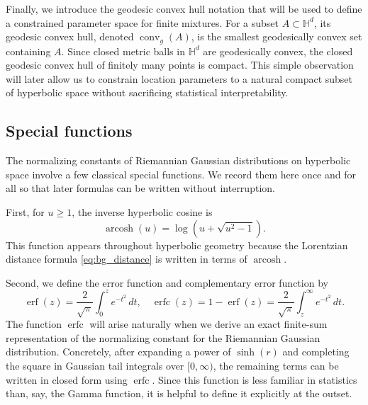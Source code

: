 \documentclass[11pt]{article}
\begin{document}
Finally, we introduce the geodesic convex hull notation that will be used to define a constrained parameter space for finite mixtures. For a subset \(A\subset\mathbb{H}^d\), its geodesic convex hull, denoted \(\operatorname{conv}_g(A)\), is the smallest geodesically convex set containing \(A\). Since closed metric balls in \(\mathbb{H}^d\) are geodesically convex, the closed geodesic convex hull of finitely many points is compact. This simple observation will later allow us to constrain location parameters to a natural compact subset of hyperbolic space without sacrificing statistical interpretability.

\subsection{Special functions}\label{subsec:background_special}

The normalizing constants of Riemannian Gaussian distributions on hyperbolic space involve a few classical special functions. We record them here once and for all so that later formulas can be written without interruption.

First, for \(u\ge 1\), the inverse hyperbolic cosine is
\begin{equation}\label{eq:bg_arcosh}
\operatorname{arcosh}(u)
=
\log\!\left(u+\sqrt{u^2-1}\right).
\end{equation}
This function appears throughout hyperbolic geometry because the Lorentzian distance formula \eqref{eq:bg_distance} is written in terms of \(\operatorname{arcosh}\).

Second, we define the error function and complementary error function by
\begin{equation*}
\operatorname{erf}(z)
=
\frac{2}{\sqrt{\pi}}\int_0^z e^{-t^2}\,dt,\quad \operatorname{erfc}(z)
=
1-\operatorname{erf}(z)
=
\frac{2}{\sqrt{\pi}}\int_z^\infty e^{-t^2}\,dt.
\end{equation*}
The function \(\operatorname{erfc}\) will arise naturally when we derive an exact finite-sum representation of the normalizing constant for the Riemannian Gaussian distribution. Concretely, after expanding a power of \(\sinh(r)\) and completing the square in Gaussian tail integrals over \([0,\infty)\), the remaining terms can be written in closed form using \(\operatorname{erfc}\). Since this function is less familiar in statistics than, say, the Gamma function, it is helpful to define it explicitly at the outset.
\end{document}
